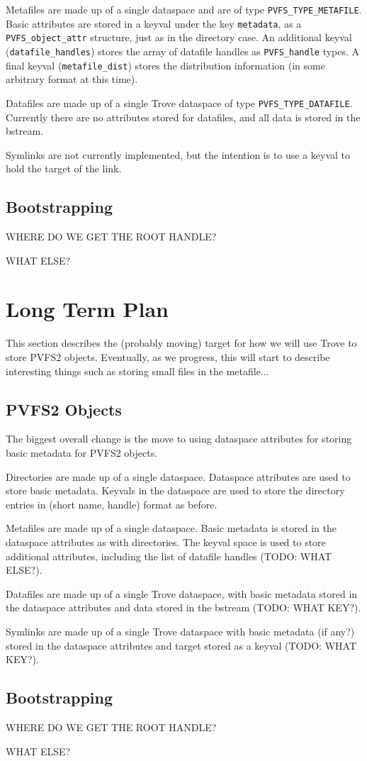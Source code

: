 \documentclass[10pt]{article} %
\begin{document}
Metafiles are made up of a single dataspace and are of type
\texttt{PVFS\_TYPE\_METAFILE}.  Basic attributes
are stored in a keyval under the key \texttt{metadata}, as a
\texttt{PVFS\_object\_attr} structure, just as in the directory case.
An additional keyval (\texttt{datafile\_handles}) stores the array of datafile
handles as \texttt{PVFS\_handle} types.  A final keyval
(\texttt{metafile\_dist}) stores the distribution information (in some
arbitrary format at this time).

Datafiles are made up of a single Trove dataspace of type
\texttt{PVFS\_TYPE\_DATAFILE}.  Currently there are no attributes stored for
datafiles, and all data is stored in the bstream.

Symlinks are not currently implemented, but the intention is to use a keyval
to hold the target of the link.

\subsection{Bootstrapping}

WHERE DO WE GET THE ROOT HANDLE?

WHAT ELSE?

\section{Long Term Plan}

This section describes the (probably moving) target for how we will use Trove
to store PVFS2 objects.  Eventually, as we progress, this will start to
describe interesting things such as storing small files in the metafile...

\subsection{PVFS2 Objects}

The biggest overall change is the move to using dataspace attributes for
storing basic metadata for PVFS2 objects.

Directories are made up of a single dataspace.  Dataspace attributes are used
to store basic metadata.  Keyvals in the dataspace are used to store the
directory entries in (short name, handle) format as before.

Metafiles are made up of a single dataspace.  Basic metadata is stored in the
dataspace attributes as with directories.  The keyval space is used to store
additional attributes, including the list of datafile handles (TODO: WHAT
ELSE?).

Datafiles are made up of a single Trove dataspace, with basic metadata stored
in the dataspace attributes and data stored in the bstream (TODO: WHAT KEY?).

Symlinks are made up of a single Trove dataspace with basic metadata (if any?)
stored in the dataspace attributes and target stored as a keyval (TODO: WHAT KEY?).

\subsection{Bootstrapping}

WHERE DO WE GET THE ROOT HANDLE?

WHAT ELSE?
\end{document}
